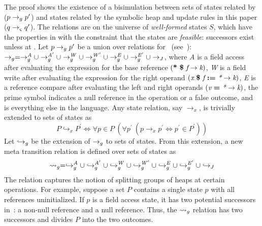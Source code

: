 The proof shows the existence of a
bisimulation between sets of states related by~\gsetxt{} ($p \rightarrow_{g}
p^\prime$) and states related by the symbolic heap and update rules in this paper ($q \rightarrow_{\varsigma}
q^\prime$). The relations are on the universe of \emph{well-formed}
states $S$, which have the properties in  with the
constraint that the states are \emph{feasible}: successors exist
unless at . Let $p \rightarrow_{g} p^\prime$ be a union over relations
for~\gsetxt{} (see~\cite{Hillery:2015}): $\rightarrow_{g} = \rightarrow_{g}^\mathit{A} \cup
\rightarrow_{g}^\mathit{A^\prime} \cup \rightarrow_{g}^\mathit{W} \cup
\rightarrow_{g}^\mathit{W^\prime} \cup \rightarrow_{g}^\mathit{E} \cup
\rightarrow_{g}^\mathit{E^\prime} \cup \rightarrow_{J}$, where \emph{A} is a field access
after evaluating the expression for the base reference $(
\textbf{*}\ \textbf{\$}\ \emph{f} \rightarrow \emph{k})$, \emph{W} is
a field write after evaluating the expression for the right operand
$\lp \cfgnt{x}\ \cfgt{\$}\ \cfgnt{f}\ \cfgt{:=}\ \cfgnt{*} \rightarrow
\cfgnt{k}\rp$, \emph{E} is a reference compare after evaluating the
left and right operands $\lp \cfgnt{v}\ \cfgt{=}\ \cfgnt{*}
\rightarrow \cfgnt{k}\rp$, the prime symbol indicates a null reference
in the operation or a false outcome, and \emph{\com} is everything
else in the language. Any state relation, say $\rightarrow_x$, is
trivially extended to sets of states as
$$
P \hookrightarrow_x P^\prime \Longleftrightarrow \forall p \in P\ (\forall p^\prime\ (p \rightarrow_x p^\prime \Leftrightarrow p^\prime \in P^\prime))
$$
Let $\hookrightarrow_{g}$ be the extension of $\rightarrow_{g}$ to sets of
states. From this extension, a new meta transition relation is defined
over sets of states as
$$
\leadsto_{g} = \hookrightarrow_{g}^\mathit{A}
\cup \hookrightarrow_{g}^\mathit{A^\prime} \cup \hookrightarrow_{g}^\mathit{W} \cup
\hookrightarrow_{g}^\mathit{W^\prime} \cup \hookrightarrow_{g}^\mathit{E} \cup \hookrightarrow_{g}^\mathit{E^\prime}
\cup \hookrightarrow_{J}
$$
The relation captures the notion of splitting groups of heaps at
certain operations. For example, suppose a set $P$ contains a single state $p$
with all references uninitialized. If $p$ is a field access state, it has two
potential successors in~\gsetxt{}: a non-null reference and a null reference. 
Thus, the $\leadsto_{g}$ relation has two successors and divides $P$ into the two outcomes.

